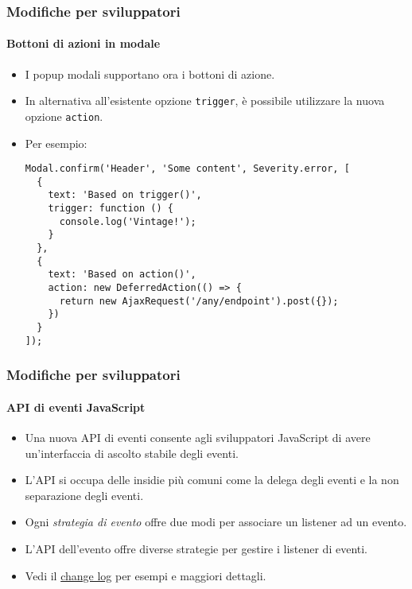 
\begin{frame}[fragile]
	\frametitle{Modifiche per sviluppatori}
	\framesubtitle{Bottoni di azioni in modale}

	\lstset{basicstyle=\tiny\ttfamily}

	\begin{itemize}
		\item I popup modali supportano ora i bottoni di azione.
		\item In alternativa all'esistente opzione \texttt{trigger}, è possibile utilizzare
			la nuova opzione \texttt{action}.
		\item Per esempio:

\vspace{-0.4cm}
\begin{lstlisting}
Modal.confirm('Header', 'Some content', Severity.error, [
  {
    text: 'Based on trigger()',
    trigger: function () {
      console.log('Vintage!');
    }
  },
  {
    text: 'Based on action()',
    action: new DeferredAction(() => {
      return new AjaxRequest('/any/endpoint').post({});
    })
  }
]);
\end{lstlisting}

	\end{itemize}

\end{frame}


\begin{frame}[fragile]
	\frametitle{Modifiche per sviluppatori}
	\framesubtitle{API di eventi JavaScript}

	\begin{itemize}
		\item Una nuova API di eventi consente agli sviluppatori JavaScript di avere un'interfaccia di ascolto stabile degli eventi.
		\item L'API si occupa delle insidie più comuni come la delega degli eventi e la non separazione degli eventi.
		\item Ogni \textit{strategia di evento} offre due modi per associare un listener ad un evento.
		\item L'API dell'evento offre diverse strategie per gestire i listener di eventi.
		\item Vedi il
			\href{https://docs.typo3.org/c/typo3/cms-core/master/en-us/Changelog/10.3/Feature-90471-JavaScriptEventAPI.html}{change log}
			per esempi e maggiori dettagli.
	\end{itemize}

\end{frame}

